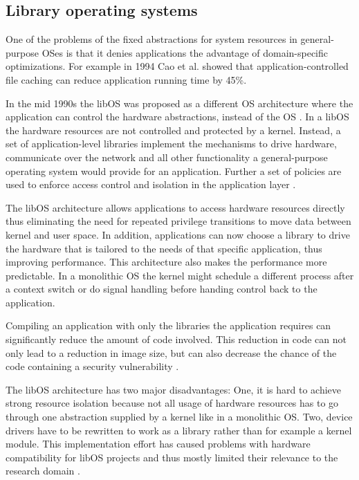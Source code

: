\documentclass[10pt,twocolumn,a4paper]{article}
\begin{document}
  \subsection{Library operating systems}\label{sec:libOS}
    One of the problems of the fixed abstractions for system resources in general-purpose OSes
    is that it denies applications the advantage of domain-specific optimizations.
    For example in 1994 Cao et al. \cite{cao94} showed that application-controlled file caching
    can reduce application running time by 45\%.

    In the mid 1990s the libOS was proposed as a different OS architecture
    where the application can control the hardware abstractions, instead of the OS \cite{engler95}.
    In a libOS the hardware resources are not controlled and protected by a kernel.
    Instead, a set of application-level libraries implement the mechanisms to drive hardware,
    communicate over the network and all other functionality a general-purpose 
    operating system would provide for an application.
    Further a set of policies are used to enforce access control and isolation in the
    application layer \cite{madhavapeddy13-2}.
    
    The libOS architecture allows applications to access hardware resources directly
    thus eliminating the need for repeated privilege transitions to move data
    between kernel and user space.
    In addition, applications can now choose a library to drive the hardware that is
    tailored to the needs of that specific application, thus improving performance.
    This architecture also makes the performance more predictable.
    In a monolithic OS the kernel might schedule a different process after a
    context switch or do signal handling before handing control back to the application.

    Compiling an application with only the libraries the application requires
    can significantly reduce the amount of code involved.
    This reduction in code can not only lead to a reduction in image size, 
    but can also decrease the chance of the code containing a 
    security vulnerability \cite{madhavapeddy13}.

    The libOS architecture has two major disadvantages:   
    One, it is hard to achieve strong resource isolation because not all
    usage of hardware resources has to go through one abstraction supplied by
    a kernel like in a monolithic OS.
    Two, device drivers have to be rewritten to work as a library rather than
    for example a kernel module.
    This implementation effort has caused problems with hardware compatibility
    for libOS projects and thus mostly limited their relevance to the
    research domain \cite{madhavapeddy13, raza19}.
\end{document}

